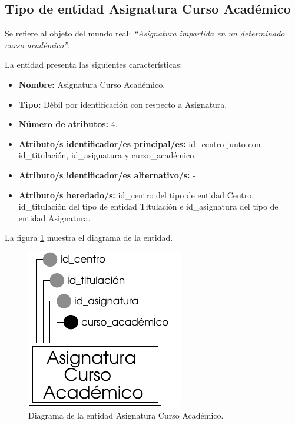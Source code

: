 \subsection{Tipo de entidad Asignatura Curso Académico}

   \begin{description}

   \item[Definición] Se refiere al objeto del mundo real: \emph{``Asignatura
   impartida en un determinado curso académico''}.

   \item[Características] La entidad presenta las siguientes características:
      \begin{itemize}
         \item \textbf{Nombre:} Asignatura Curso Académico.
         \item \textbf{Tipo:} Débil por identificación con respecto a Asignatura.
         \item \textbf{Número de atributos:} 4.
         \item \textbf{Atributo/s identificador/es principal/es:} id\_centro junto con \\id\_titulación, id\_asignatura y curso\_académico.
         \item \textbf{Atributo/s identificador/es alternativo/s:} -
         \item \textbf{Atributo/s heredado/s:} id\_centro del tipo de entidad Centro, \\id\_titulación del tipo de entidad Titulación e id\_asignatura del tipo de entidad Asignatura.
      \end{itemize}

   \item[Diagrama] La figura \ref{diagramaACA} muestra el diagrama de la entidad.
   \item \begin{figure}[!ht]
            \begin{center}
            \includegraphics[]{07.Modelo_Entidad-Interrelacion/7.2.Analisis_Entidades/diagramas/aca.pdf}
            \caption{Diagrama de la entidad Asignatura Curso Académico.}
            \label{diagramaACA}
            \end{center}
         \end{figure}


\end{description}
